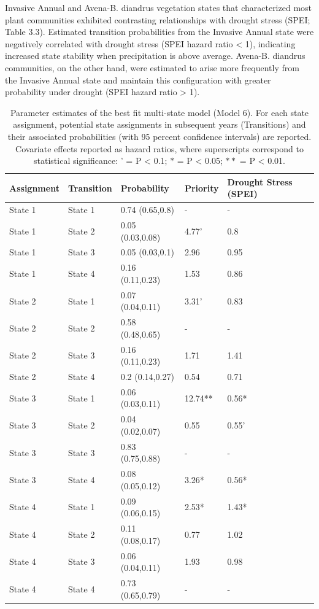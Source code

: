 \documentclass[twoside,12pt,final]{ucthesis-CA2012}
\begin{document}
\begin{ucmainmatter}
Invasive Annual and Avena-B. diandrus vegetation states that characterized most plant communities exhibited contrasting relationships with drought stress (SPEI; Table 3.3).
Estimated transition probabilities from the Invasive Annual state were negatively correlated with drought stress (SPEI hazard ratio \textless{} 1), indicating increased state stability when precipitation is above average.
Avena-B. diandrus communities, on the other hand, were estimated to arise more frequently from the Invasive Annual state and maintain this configuration with greater probability under drought (SPEI hazard ratio \textgreater{} 1).
\begin{table}[ht]
\centering
\begin{tabular}{lllll}
  \hline
Assignment & Transition & Probability & Priority & Drought Stress (SPEI) \\ 
  \hline
State 1 & State 1 & 0.74 (0.65,0.8) & - & - \\ 
  State 1 & State 2 & 0.05 (0.03,0.08) & 4.77' & 0.8 \\ 
  State 1 & State 3 & 0.05 (0.03,0.1) & 2.96 & 0.95 \\ 
  State 1 & State 4 & 0.16 (0.11,0.23) & 1.53 & 0.86 \\ 
  State 2 & State 1 & 0.07 (0.04,0.11) & 3.31' & 0.83 \\ 
  State 2 & State 2 & 0.58 (0.48,0.65) & - & - \\ 
  State 2 & State 3 & 0.16 (0.11,0.23) & 1.71 & 1.41 \\ 
  State 2 & State 4 & 0.2 (0.14,0.27) & 0.54 & 0.71 \\ 
  State 3 & State 1 & 0.06 (0.03,0.11) & 12.74** & 0.56* \\ 
  State 3 & State 2 & 0.04 (0.02,0.07) & 0.55 & 0.55' \\ 
  State 3 & State 3 & 0.83 (0.75,0.88) & - & - \\ 
  State 3 & State 4 & 0.08 (0.05,0.12) & 3.26* & 0.56* \\ 
  State 4 & State 1 & 0.09 (0.06,0.15) & 2.53* & 1.43* \\ 
  State 4 & State 2 & 0.11 (0.08,0.17) & 0.77 & 1.02 \\ 
  State 4 & State 3 & 0.06 (0.04,0.11) & 1.93 & 0.98 \\ 
  State 4 & State 4 & 0.73 (0.65,0.79) & - & - \\ 
   \hline
\end{tabular}
\caption{Parameter estimates of the best fit multi-state model (Model 6). For each state assignment, potential state assignments in subsequent years (Transitions) and their associated probabilities (with 95 percent confidence intervals) are reported. Covariate effects reported as hazard ratios, where superscripts correspond to statistical significance: ' = P < 0.1; $*$ = P < 0.05; $**$ = P < 0.01.} 

\end{table}
\end{ucmainmatter}
\end{document}
